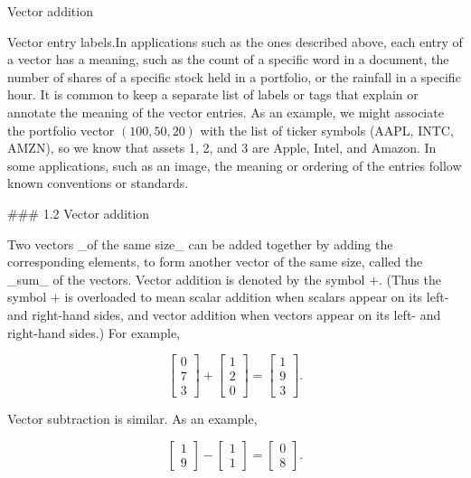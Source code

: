 Vector addition

Vector entry labels.In applications such as the ones described above, each entry of a vector has a meaning, such as the count of a specific word in a document, the number of shares of a specific stock held in a portfolio, or the rainfall in a specific hour. It is common to keep a separate list of labels or tags that explain or annotate the meaning of the vector entries. As an example, we might associate the portfolio vector \((100,50,20)\) with the list of ticker symbols (AAPL, INTC, AMZN), so we know that assets 1, 2, and 3 are Apple, Intel, and Amazon. In some applications, such as an image, the meaning or ordering of the entries follow known conventions or standards.

### 1.2 Vector addition

Two vectors _of the same size_ can be added together by adding the corresponding elements, to form another vector of the same size, called the _sum_ of the vectors. Vector addition is denoted by the symbol \(+\). (Thus the symbol \(+\) is overloaded to mean scalar addition when scalars appear on its left- and right-hand sides, and vector addition when vectors appear on its left- and right-hand sides.) For example,

\[\left[\begin{array}{c}0\\ 7\\ 3\end{array}\right]+\left[\begin{array}{c}1\\ 2\\ 0\end{array}\right]=\left[\begin{array}{c}1\\ 9\\ 3\end{array}\right].\]

Vector subtraction is similar. As an example,

\[\left[\begin{array}{c}1\\ 9\end{array}\right]-\left[\begin{array}{c}1\\ 1\end{array}\right]=\left[\begin{array}{c}0\\ 8\end{array}\right].\]

